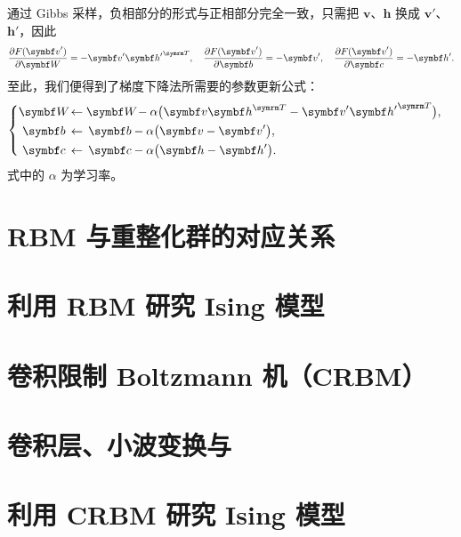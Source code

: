 通过 Gibbs 采样，负相部分的形式与正相部分完全一致，只需把 $\bm{v}$、$\bm{h}$ 换成 $\bm{v}'$、
$\bm{h}'$，因此
\begin{equation}
  \pdv{F(\bm{v}')}{\bm{W}} = - \bm{v}' {\bm{h}'}^\trans \qc
  \pdv{F(\bm{v}')}{\bm{b}} = - \bm{v}' \qc
  \pdv{F(\bm{v}')}{\bm{c}} = - \bm{h}'.
\end{equation}
至此，我们便得到了梯度下降法所需要的参数更新公式：
\begin{equation}
  \left\{
  \begin{aligned}
    \bm{W} \! &\gets \bm{W} \! - \alpha \qty\big(\bm{v} \bm{h}^\trans
                                                 - \bm{v}' {\bm{h}'}^\trans) \qc \\
    \bm{b} \, &\gets \, \bm{b} - \alpha \qty\big(\bm{v} - \bm{v}') \qc \\
    \bm{c} \, &\gets \, \bm{c} - \alpha \qty\big(\bm{h} - \bm{h}').
  \end{aligned}
  \right.
\end{equation}
式中的 $\alpha$ 为学习率。

\section{RBM 与重整化群的对应关系}

\section{利用 RBM 研究 Ising 模型}
\section{卷积限制 Boltzmann 机（CRBM）}
\section{卷积层、小波变换与 \AdSCFT{}}
\section{利用 CRBM 研究 Ising 模型}
